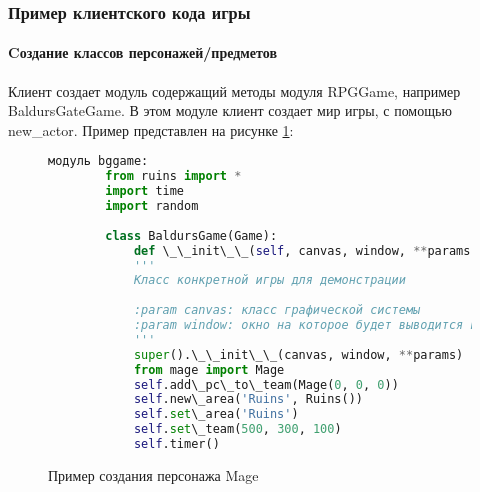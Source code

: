 \subsubsection{Пример клиентского кода игры}
\paragraph{Cоздание классов персонажей/предметов}
Клиент создает модуль содержащий методы модуля RPGGame, например BaldursGateGame. В этом модуле клиент создает мир игры, с помощью new\_actor.
Пример представлен на рисунке \ref{answer:image}:
\begin{figure}[H]
	\begin{lstlisting}[language=Python]
		модуль bggame:
		from ruins import *
		import time
		import random
		
		class BaldursGame(Game):
			def \_\_init\_\_(self, canvas, window, **params):
			'''
			Класс конкретной игры для демонстрации
		
			:param canvas: класс графической системы
			:param window: окно на которое будет выводится игра
			'''
			super().\_\_init\_\_(canvas, window, **params)
			from mage import Mage
			self.add\_pc\_to\_team(Mage(0, 0, 0))
			self.new\_area('Ruins', Ruins())
			self.set\_area('Ruins')
			self.set\_team(500, 300, 100)
			self.timer()
	\end{lstlisting}  
\caption{Пример создания персонажа Mage}
\label{answer:image}
\end{figure}


